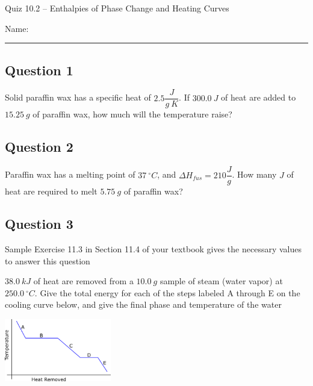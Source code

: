\documentclass[11pt, letterpaper]{memoir}
\begin{document}
	\begin{center}
		{\large	Quiz 10.2 -- Enthalpies of Phase Change and Heating Curves}
	\end{center}
	{\large Name: \rule[-1mm]{4in}{.1pt} 
		
	\subsection*{Question 1}
	Solid paraffin wax has a specific heat of $2.5\dfrac{J}{g~K}$. If $300.0~J$ of heat are added to $15.25~g$ of paraffin wax, how much will the temperature raise?
	
	\vspace{4.5em}
	\subsection*{Question 2}
	Paraffin wax has a melting point of $37~^\circ C$, and $\Delta H_{fus}=210\dfrac{J}{g}$. How many $J$ of heat are required to melt $5.75~g$ of paraffin wax?
	
	\vspace{4.5em}
	\subsection*{Question 3}
	Sample Exercise 11.3 in Section 11.4 of your textbook gives the necessary values to answer this question
	
	\noindent $38.0~kJ$ of heat are removed from a $10.0~g$ sample of steam (water vapor) at $250.0~^\circ C$. Give the total energy for each of the steps labeled A through E on the cooling curve below, and give the final phase and temperature of the water
	
	
	
	\vspace{12em} 
	\hspace{-3em}\includegraphics[width=0.35\textwidth]{Cooling_Curve}
	
	\newpage
	\pagestyle{empty}
	\addtocounter{page}{-1}
}
\end{document}
